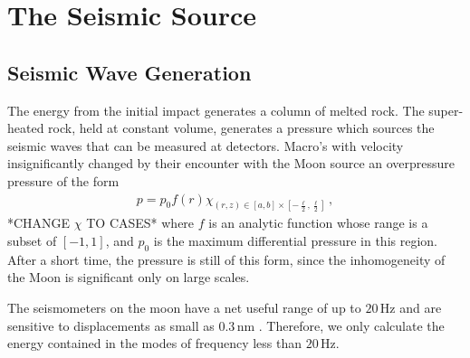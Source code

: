 \documentclass[prd,reprint,10pt]{revtex4-1}
\newcommand*\te[1]{\text{#1}}
\newcommand*\f[2]{\frac{#1}{#2}}
\begin{document}
\section{The Seismic Source}
\subsection{Seismic Wave Generation}
The energy from the initial impact generates a column of melted rock. The super-heated rock, held at constant volume, generates a pressure which sources the seismic waves that can be measured at detectors. Macro's with velocity insignificantly changed by their encounter with the Moon source an overpressure pressure of the form
\begin{align}
p = p_0 f(r)\chi_{(r,z)\in [a,b]\times [-\f \ell 2,\f \ell 2]}\,,
\end{align}
*CHANGE $\chi$ TO CASES*
where $f$ is an analytic function whose range is a subset of $[-1,1]$, and $p_0$ is the maximum differential pressure in this region. After a short time, the pressure is still of this form, since the inhomogeneity of the Moon is significant only on large scales.

The seismometers on the moon have a net useful range of up to $20\,\te{Hz}$ and are sensitive to displacements as small as $0.3\,\text{nm}$ \cite{latham1973lunar}. Therefore, we only calculate the energy contained in the modes of frequency less than $20\,\te{Hz}$. 
\end{document}
